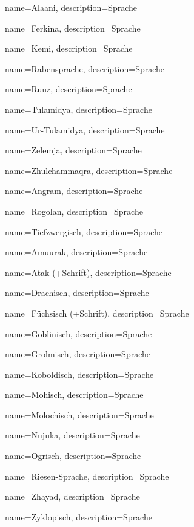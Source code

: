 {
    name={Alaani},
    description={Sprache}
}


{
    name={Ferkina},
    description={Sprache}
}


{
    name={Kemi},
    description={Sprache}
}


{
    name={Rabensprache},
    description={Sprache}
}


{
    name={Ruuz},
    description={Sprache}
}


{
    name={Tulamidya},
    description={Sprache}
}


{
    name={Ur-Tulamidya},
    description={Sprache}
}


{
    name={Zelemja},
    description={Sprache}
}


{
    name={Zhulchammaqra},
    description={Sprache}
}


{
    name={Angram},
    description={Sprache}
}


{
    name={Rogolan},
    description={Sprache}
}


{
    name={Tiefzwergisch},
    description={Sprache}
}


{
    name={Amuurak},
    description={Sprache}
}


{
    name={Atak (+Schrift)},
    description={Sprache}
}


{
    name={Drachisch},
    description={Sprache}
}


{
    name={Füchsisch (+Schrift)},
    description={Sprache}
}


{
    name={Goblinisch},
    description={Sprache}
}


{
    name={Grolmisch},
    description={Sprache}
}


{
    name={Koboldisch},
    description={Sprache}
}


{
    name={Mohisch},
    description={Sprache}
}


{
    name={Molochisch},
    description={Sprache}
}


{
    name={Nujuka},
    description={Sprache}
}


{
    name={Ogrisch},
    description={Sprache}
}


{
    name={Riesen-Sprache},
    description={Sprache}
}


{
    name={Zhayad},
    description={Sprache}
}


{
    name={Zyklopisch},
    description={Sprache}
}


